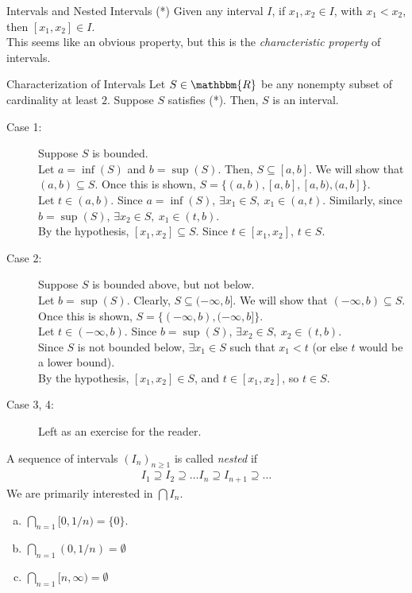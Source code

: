 \documentclass[10pt]{extarticle}
\newcommand{\R}{\mathbbm{R}}
\begin{document}
  \begin{problem}{Intervals and Nested Intervals}
    (*) Given any interval $I$, if $x_1,x_2\in I$, with $x_1 < x_2$, then $[x_1,x_2]\in I$.\\

    This seems like an obvious property, but this is the \textsl{characteristic property} of intervals.
    \begin{problem}{Characterization of Intervals}
      Let $S\in\R$ be any nonempty subset of cardinality at least $2$. Suppose $S$ satisfies (*). Then, $S$ is an interval.
      \tcblower
      \begin{description}
        \item[Case 1:] Suppose $S$ is bounded.\\

          Let $a = \inf(S)$ and $b = \sup(S)$. Then, $S \subseteq [a,b]$. We will show that $(a,b)\subseteq S$. Once this is shown, $S = \{(a,b), [a,b], [a,b), (a,b]\}$.\\

          Let $t\in (a,b)$. Since $a = \inf(S)$, $\exists x_1\in S,~x_1 \in (a,t)$. Similarly, since $b = \sup(S)$, $\exists x_2\in S,~x_1\in (t,b)$.\\

          By the hypothesis, $[x_1,x_2]\subseteq S$. Since $t\in [x_1,x_2]$, $t\in S$.
        \item[Case 2:] Suppose $S$ is bounded above, but not below.\\

          Let $b = \sup(S)$. Clearly, $S \subseteq (-\infty,b]$. We will show that $(-\infty,b)\subseteq S$. Once this is shown, $S = \{(-\infty,b), (-\infty,b]\}$.\\

          Let $t\in (-\infty,b)$. Since $b = \sup(S)$, $\exists x_2\in S,~x_2\in (t,b)$.\\

          Since $S$ is not bounded below, $\exists x_1\in S$ such that $x_1 < t$ (or else $t$ would be a lower bound).\\

          By the hypothesis, $[x_1,x_2]\in S$, and $t\in [x_1,x_2]$, so $t\in S$.
        \item[Case 3, 4:] Left as an exercise for the reader.
      \end{description}
    \end{problem}
    A sequence of intervals $(I_n)_{n \geq 1}$ is called \textsl{nested} if
    \begin{align*}
      I_1 \supseteq I_2 \supseteq \dots I_n \supseteq I_{n+1} \supseteq\dots
    \end{align*}
    We are primarily interested in $\bigcap I_n$.
    \begin{enumerate}[(a)]
      \item $\bigcap_{n=1}[0,1/n) = \{0\}$.
      \item $\bigcap_{n=1}(0,1/n) = \emptyset$
      \item $\bigcap_{n=1}[n,\infty) = \emptyset$
    \end{enumerate}
  \end{problem}
\end{document}
